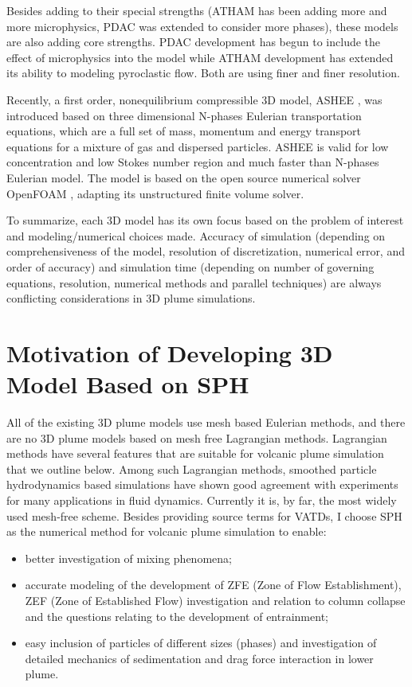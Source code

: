 Besides adding to their special strengths (ATHAM has been adding more and more microphysics, PDAC was extended to consider more phases), these models are also adding core strengths. PDAC development has begun to include the effect of microphysics into the model while ATHAM development has extended its ability to modeling pyroclastic flow. Both are using finer and finer resolution. 

Recently, a first order, nonequilibrium compressible 3D model, ASHEE \citep{cerminara2016ashee}, was introduced based on three dimensional N-phases Eulerian transportation equations, which are a full set of mass, momentum and energy transport equations for a mixture of gas and dispersed particles. ASHEE is valid for low concentration and low Stokes number region and much faster than N-phases Eulerian model. The model is based on the open source numerical solver OpenFOAM \citep{weller1998tensorial}, adapting its unstructured finite volume solver.

To summarize, each 3D model has its own focus based on the problem of interest and modeling/numerical choices made.
Accuracy of simulation (depending on comprehensiveness of the model, resolution of discretization, numerical error, and order of accuracy) and simulation time (depending on number of governing equations, resolution, numerical methods and parallel techniques) are always conflicting considerations in 3D plume simulations.

\section{Motivation of Developing 3D Model Based on SPH}

All of the existing 3D plume models use mesh based Eulerian methods, and there are no 3D plume models based on mesh free Lagrangian methods. Lagrangian methods have several features that are suitable for volcanic plume simulation that we outline below. Among such Lagrangian methods, smoothed particle hydrodynamics \citep{gingold1977smoothed,lucy1977numerical} based simulations have shown good agreement with experiments for many applications in fluid dynamics. Currently it is, by far, the most widely used mesh-free scheme.
Besides providing source terms for VATDs, I choose SPH as the numerical method for volcanic plume simulation to enable:
\begin{itemize}
\item better investigation of mixing phenomena;
\item accurate modeling of the development of ZFE (Zone of Flow Establishment), ZEF (Zone of Established Flow) investigation and relation to column collapse and the questions relating to the development of entrainment;
\item easy inclusion of particles of different sizes (phases) and investigation of detailed mechanics of sedimentation and drag force interaction in lower plume.
\end{itemize}

